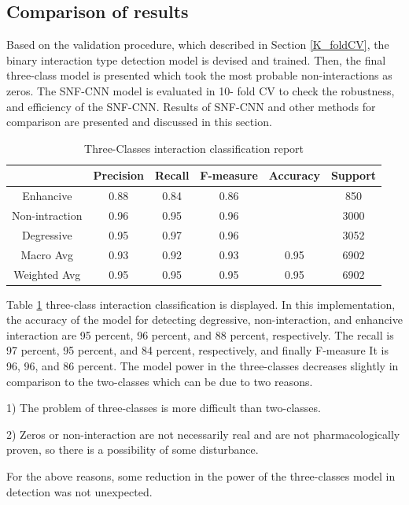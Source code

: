 \documentclass{bmcart}
\begin{document}
\subsection*{Comparison of results}
Based on the validation procedure, which described in Section \ref{K_foldCV}, the binary interaction type detection model is devised and trained. Then, the final three-class model is presented which took the most probable non-interactions as zeros. The SNF-CNN model is evaluated in 10- fold CV to check the robustness, and efficiency of the SNF-CNN. Results of SNF-CNN and other methods for comparison are presented and discussed in this section. 

\begin{table}[h!]
\centering
\begin{tabular}{|c|c|c|c|c|c|}
\hline
& Precision & Recall & F-measure &Accuracy& Support  \\
\hline
Enhancive & 0.88 & 0.84 & 0.86 && 850\\
\hline
Non-intraction & 0.96 & 0.95 & 0.96 && 3000\\
\hline
Degressive & 0.95 & 0.97 & 0.96 && 3052\\
\hline
Macro Avg & 0.93 & 0.92 & 0.93 & 0.95& 6902 \\
\hline
Weighted Avg & 0.95 & 0.95 &0.95 & 0.95& 6902\\
\hline
\end{tabular}
\newline
	\caption{Three-Classes interaction classification report}
	\label{TripleclassificatonReport}
\end{table}

Table \ref{TripleclassificatonReport} three-class interaction classification is displayed. In this implementation, the accuracy of the model for detecting degressive, non-interaction, and enhancive interaction are 95 percent, 96 percent, and 88 percent, respectively. The recall is 97 percent, 95 percent, and 84 percent, respectively, and finally F-measure It is 96, 96, and 86 percent. The model power in the three-classes decreases slightly in comparison to the two-classes which can be due to two reasons.

1) The problem of three-classes is more difficult than two-classes.

2) Zeros or non-interaction are not necessarily real and are not pharmacologically proven, so there is a possibility of some disturbance.

For the above reasons, some reduction in the power of the three-classes model in detection was not unexpected.
\end{document}
